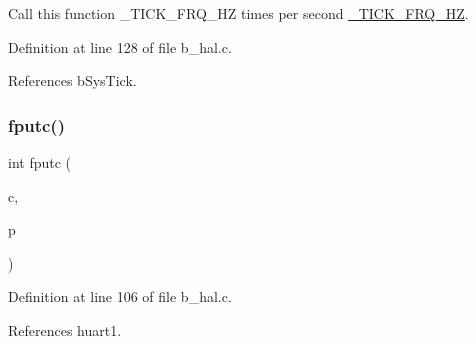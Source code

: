 Call this function \+\_\+\+T\+I\+C\+K\+\_\+\+F\+R\+Q\+\_\+\+HZ times per second \mbox{\hyperlink{b__config_8h_ae2076738df8e2eff78366a0187291367}{\+\_\+\+T\+I\+C\+K\+\_\+\+F\+R\+Q\+\_\+\+HZ}}. 



Definition at line 128 of file b\+\_\+hal.\+c.



References b\+Sys\+Tick.

\mbox{\label{group___h_a_l___exported___functions_gaf709c07e26adbffa5d9984b2cec63c69}} 
\subsubsection{\texorpdfstring{fputc()}{fputc()}}
{\footnotesize\ttfamily int fputc (\begin{DoxyParamCaption}\item[{int}]{c,  }\item[{F\+I\+LE $\ast$}]{p }\end{DoxyParamCaption})}



Definition at line 106 of file b\+\_\+hal.\+c.



References huart1.

